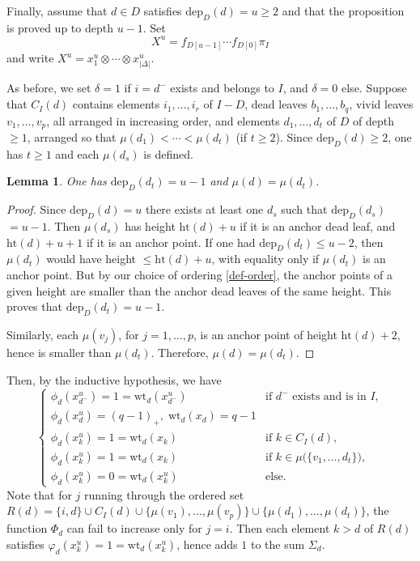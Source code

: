 \documentclass[12pt]{amsart}
\numberwithin{equation}{section}
\newtheorem{lem}[thm]{Lemma}
\theoremstyle{definition}
\def\dep{\mathrm{dep}} %
\def\haut{\mathrm{ht}} %
\def\wt{\mathrm{wt}}  %
\begin{document}
\subsubsection{}\label{subsub-depth2}  Finally, assume that $d\in D$ satisfies $\dep_D(d) = u \geq 2$ and that the proposition is 
proved up to depth $u-1$. Set 
\begin{equation} 
X^u = f_{D[u-1]} \cdots f_{D[0]} \pi_I 
\end{equation} 
and write $X^u = x_1^u \otimes \cdots \otimes x^u_{\vert \Delta \vert}$. 

As before, we set $\delta = 1$ if $i = d^-$ exists and belongs to $I$, and $\delta = 0$ else. 
Suppose that $C_I(d)$ contains elements $i_1,\dots, i_r$ of $I - D$, 
dead leaves $b_1,\dots, b_q$, vivid leaves $v_1,\dots, v_p$, all arranged in increasing order, and  
elements $d_1,\dots, d_t$ of $D$ of depth $\geq 1$, arranged so that 
$\mu(d_1) < \cdots < \mu(d_t)$ (if $t\geq 2$). 
Since $\dep_D(d) \geq 2$, one has $t\geq 1$ and each $\mu(d_s)$ is defined. 

\begin{lem} 
One has $\dep_D(d_t) = u-1$ and $\mu(d) = \mu(d_t)$. 
\end{lem} 

\begin{proof} 
Since $\dep_D(d) = u$  there exists at least one $d_s$ such that $\dep_D(d_s)$ $= u-1$. Then 
$\mu(d_s)$ has height $\haut(d)+u$ if it is an anchor dead leaf, and $\haut(d)+u+1$ if it is an anchor point. 
If one had $\dep_D(d_t) \leq u-2$, then $\mu(d_t)$ would have height $\leq \haut(d)+u$, with equality only 
if $\mu(d_t)$ is an anchor point. But by our choice of ordering \ref{def-order}, the anchor points of a given height 
are smaller than the anchor dead leaves of the same height. This proves that  $\dep_D(d_t) = u-1$. 

Similarly, each $\mu(v_j)$, for $j = 1,\dots, p$, is an anchor point of height $\haut(d) + 2$, hence is smaller 
than $\mu(d_t)$. Therefore, $\mu(d) = \mu(d_t)$. 
\end{proof} 


Then, by the inductive hypothesis, we have 
\begin{equation}\label{eqref-depthu} 
\begin{cases} 
\phi_d(x_{d^-}^u) = 1 = \wt_d(x_{d^-}^u) & \text{if $d^-$ exists and is in } I, 
\\
\phi_d(x_d^u) = (q{-}1)_+, \; \wt_d(x_d) = q{-}1 & 
\\
\phi_d(x_k^u) = 1 = \wt_d(x_k) & \text{if } k\in C_I(d), 
\\
\phi_d(x_k^u) = 1 = \wt_d(x_k) & \text{if } k \in \mu\big( \{v_1,\dots, d_t\} \big), 
\\
\phi_d(x_k^u) = 0 = \wt_d(x_k^u) & \text{else}. 
\end{cases} 
\end{equation} 
Note that for $j$ running through the ordered set  $R(d) = \{i, d\} \cup C_I(d) \cup \{\mu(v_1), \dots, \mu(v_p)\} \cup 
\{\mu(d_1), \dots, \mu(d_t)\}$, the function $\Phi_d$ can fail to increase only for $j = i$. Then 
each element $k > d$ of $R(d)$ satisfies $\varphi_d(x^u_k) = 1 = \wt_d(x^u_k)$, hence adds $1$ to the sum 
$\Sigma_d$. 
\end{document}
